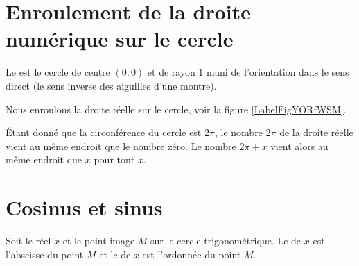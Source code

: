 
\section{Enroulement de la droite numérique sur le cercle}

\begin{definition}
    Le  est le cercle de centre \( (0;0)\) et de rayon \( 1\) muni de l'orientation dans le sens direct (le sens inverse des aiguilles d'une montre).
\end{definition}

Nous enroulons la droite réelle sur le cercle, voir la figure \ref{LabelFigYORfWSM}. %
\newcommand{\CaptionFigYORfWSM}{Un cercle trigonométrique avec enroulement de la droite rélle.}


Étant donné que la circonférence du cercle est \( 2\pi\), le nombre \( 2\pi\) de la droite réelle vient au même endroit que le nombre zéro. Le nombre \( 2\pi+x\) vient alors au même endroit que \( x\) pour tout \( x\).

\section{Cosinus et sinus}

\begin{definition}
    \begin{multicols}{2}
    Soit le réel \( x\) et le point image \( M\) sur le cercle trigonométrique. Le  de \( x\) est l'abscisse du point \( M\) et le  de \(x\) est l'ordonnée du point \( M\).

    \columnbreak

    \begin{center}

    \end{center}

    \end{multicols}
\end{definition}


